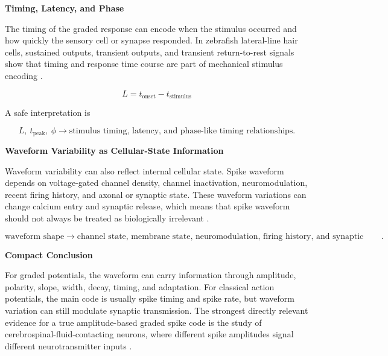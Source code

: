 \documentclass{book}
\providecommand{\ProjectDeepHeading}[2]{%
    \par\medskip\noindent\textbf{#2}\par\smallskip
}
\begin{document}
        \ProjectDeepHeading{13}{Timing, Latency, and Phase}
            
            The timing of the graded response can encode when the stimulus occurred and how quickly the sensory cell or synapse responded. In zebrafish lateral-line hair cells, sustained outputs, transient outputs, and transient return-to-rest signals show that timing and response time course are part of mechanical stimulus encoding \citep{pichler-2019-the-transfer-characteristics-of-hair-cells-encoding-mechanical-stimuli-in-the-lateral-line-of-zebrafish}.
            
            \begin{equation}
                L
                =
                t_{\mathrm{onset}}-t_{\mathrm{stimulus}}
            \end{equation}
            
            A safe interpretation is
            
            \begin{equation}
                L,\ t_{\mathrm{peak}},\ \ensuremath{\phi}
                \rightarrow
                \text{stimulus timing, latency, and phase-like timing relationships}.
            \end{equation}
        
        \ProjectDeepHeading{13}{Waveform Variability as Cellular-State Information}
            
            Waveform variability can also reflect internal cellular state. Spike waveform depends on voltage-gated channel density, channel inactivation, neuromodulation, recent firing history, and axonal or synaptic state. These waveform variations can change calcium entry and synaptic release, which means that spike waveform should not always be treated as biologically irrelevant \citep{zbili-2019-past-and-future-of-analog-digital-modulation-of-synaptic-transmission}.
            
            \begin{equation}
                \text{waveform shape}
                \rightarrow
                \text{channel state, membrane state, neuromodulation, firing history, and synaptic strength}.
            \end{equation}
        
        \ProjectDeepHeading{13}{Compact Conclusion}
            
            For graded potentials, the waveform can carry information through amplitude, polarity, slope, width, decay, timing, and adaptation. For classical action potentials, the main code is usually spike timing and spike rate, but waveform variation can still modulate synaptic transmission. The strongest directly relevant evidence for a true amplitude-based graded spike code is the study of cerebrospinal-fluid-contacting neurons, where different spike amplitudes signal different neurotransmitter inputs \citep{johnson-2023-graded-spikes-differentially-signal-neurotransmitter-input-in-cerebrospinal-fluid-contacting-neurons-of-the-mouse-spinal-cord}.
\end{document}
